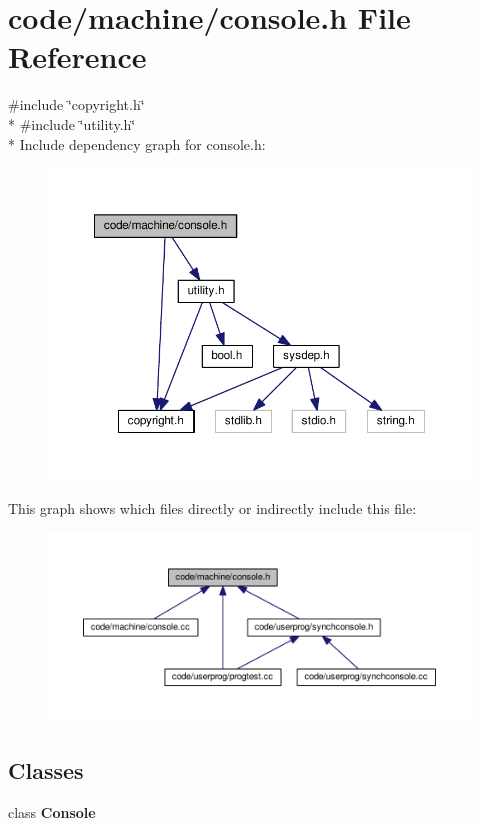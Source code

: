 \section{code/machine/console.h File Reference}
\label{console_8h}
{\ttfamily \#include \char`\"{}copyright.\+h\char`\"{}}\\*
{\ttfamily \#include \char`\"{}utility.\+h\char`\"{}}\\*
Include dependency graph for console.\+h\+:
\nopagebreak
\begin{figure}[H]
\begin{center}
\leavevmode
\includegraphics[width=350pt]{console_8h__incl}
\end{center}
\end{figure}
This graph shows which files directly or indirectly include this file\+:
\nopagebreak
\begin{figure}[H]
\begin{center}
\leavevmode
\includegraphics[width=350pt]{console_8h__dep__incl}
\end{center}
\end{figure}
\subsection*{Classes}
\begin{DoxyCompactItemize}
\item 
class {\bf Console}
\end{DoxyCompactItemize}
